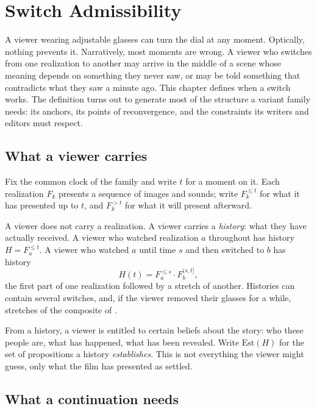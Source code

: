 \chapter{Switch Admissibility}\label{ch:switch-admissibility}

A viewer wearing adjustable glasses can turn the dial at any moment. Optically, nothing prevents it. Narratively, most moments are wrong. A viewer who switches from one realization to another may arrive in the middle of a scene whose meaning depends on something they never saw, or may be told something that contradicts what they saw a minute ago. This chapter defines when a switch works. The definition turns out to generate most of the structure a variant family needs: its anchors, its points of reconvergence, and the constraints its writers and editors must respect.

\section{What a viewer carries}

Fix the common clock of the family and write $t$ for a moment on it. Each realization $F_k$ presents a sequence of images and sounds; write $F_k^{\le t}$ for what it has presented up to $t$, and $F_k^{>t}$ for what it will present afterward.

A viewer does not carry a realization. A viewer carries a \emph{history}: what they have actually received. A viewer who watched realization $a$ throughout has history $H=F_a^{\le t}$. A viewer who watched $a$ until time $s$ and then switched to $b$ has history
\begin{equation}
H(t)=F_a^{\le s}\cdot F_b^{(s,t]},
\end{equation}
the first part of one realization followed by a stretch of another. Histories can contain several switches, and, if the viewer removed their glasses for a while, stretches of the composite of .

From a history, a viewer is entitled to certain beliefs about the story: who these people are, what has happened, what has been revealed. Write $\mathrm{Est}(H)$ for the set of propositions a history \emph{establishes}. This is not everything the viewer might guess, only what the film has presented as settled.

\section{What a continuation needs}


